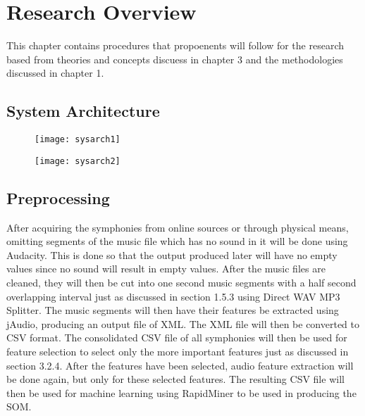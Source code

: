 %
%
%                 

\chapter{Research Overview}
This chapter contains procedures that propoenents will follow for the research based from theories and concepts discuess in chapter 3 and the methodologies discussed in chapter 1.

\section{System Architecture}

\begin{figure}[h]
\centering
\texttt{[image: sysarch1]}
\end{figure}

\begin{figure}[h]
\centering
\texttt{[image: sysarch2]}
\end{figure}

\section{Preprocessing}

After acquiring the symphonies from online sources or through physical means, omitting segments of the music file which has no sound in it will be done using Audacity. This is done so that the output produced later will have no empty values since no sound will result in empty values. After the music files are cleaned, they will then be cut into one second music segments with a half second overlapping interval just as discussed in section 1.5.3 using Direct WAV MP3 Splitter. The music segments will then have their features be extracted using jAudio, producing an output file of XML. The XML file will then be converted to CSV format. The consolidated CSV file of all symphonies will then be used for feature selection to select only the more important features just as discussed in section 3.2.4. After the features have been selected, audio feature extraction will be done again, but only for these selected features. The resulting CSV file will then be used for machine learning using RapidMiner to be used in producing the SOM.

